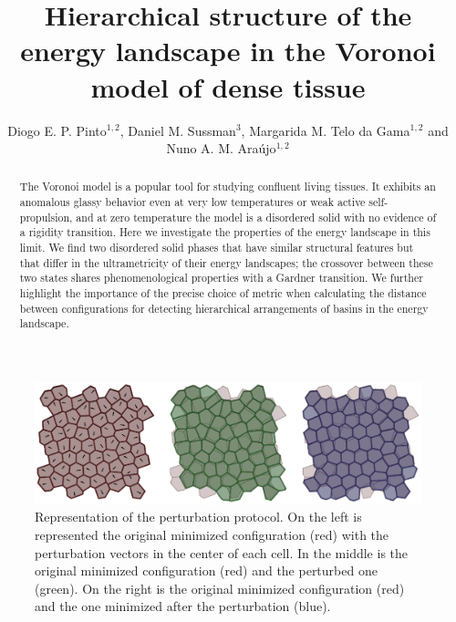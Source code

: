 \documentclass[reprint,amsmath,amssymb,aps]{revtex4-2}
\begin{document}
\title{Hierarchical structure of the energy landscape in the Voronoi model of dense tissue}

\author{Diogo E. P. Pinto$^{1,2}$, Daniel M. Sussman$^{3}$, Margarida M. Telo da Gama$^{1,2}$ and Nuno A. M. Ara\'{u}jo$^{1,2}$}


\begin{abstract}
The Voronoi model is a popular tool for studying confluent living tissues. It exhibits an anomalous glassy behavior even at very low temperatures or weak active self-propulsion, and at zero temperature the model is a disordered solid with no evidence of a rigidity transition. Here we investigate the properties of the energy landscape in this limit. We find two disordered solid phases that have similar structural features but that differ in the ultrametricity of their energy landscapes; the crossover between these two states shares phenomenological properties with a Gardner transition. We further highlight the importance of the precise choice of metric when calculating the distance between configurations for detecting hierarchical arrangements of basins in the energy landscape.
\end{abstract}

\maketitle

\begin{figure}[t]
	\includegraphics{fig1.eps}
	\caption{\label{model} Representation of the perturbation protocol. On the left is represented the original minimized configuration (red) with the perturbation vectors in the center of each cell. In the middle is the original minimized configuration (red) and the perturbed one (green). On the right is the original minimized configuration (red) and the one minimized after the perturbation (blue).}
\end{figure}
\end{document}
